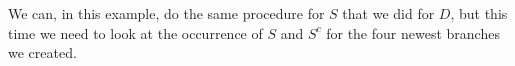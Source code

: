 \begin{figure}[ht!]
    \centering
    \caption{ }
\end{figure}

We can, in this example, do the same procedure for $S$ that we did for $D$, but this time we need to look at the occurrence of $S$ and $S^{c}$ for the four newest branches we created. 

\begin{figure}[ht!]
    \centering
    \caption{ }
\end{figure}


